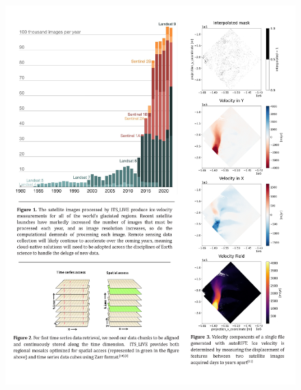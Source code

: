 \documentclass[
  super,
  preprint,
  3p,
  twocolumn]{elsarticle}
\begin{document}
\newpage{}

\newpage{}

\clearpage

\pagebreak

\newpage{}

\begin{figure}

{\centering 

\includegraphics{figures/figure-1-full.jpg}

}

\caption{\label{fig-1}\citep[See][]{Miles2023-yj, Fouilloux2018-jw, Scambos1992-jz}}

\end{figure}
\end{document}
